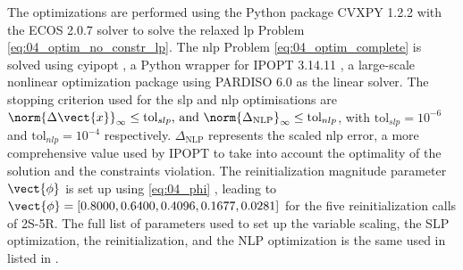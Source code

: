 The optimizations are performed using the Python package CVXPY 1.2.2  with the ECOS 2.0.7  solver to solve the relaxed \gls{lp} Problem \eqref{eq:04_optim_no_constr_lp}. The \gls{nlp} Problem \eqref{eq:04_optim_complete} is solved using cyipopt , a Python wrapper for IPOPT 3.14.11 , a large-scale nonlinear optimization package using PARDISO 6.0  as the linear solver. The stopping criterion used for the \gls{slp} and \gls{nlp} optimisations are $\norm{\Delta \vect{x}}_\infty \leq \text{tol}_{slp}  \text{, and } \norm{\Delta_{\text{NLP}}}_\infty \leq \text{tol}_{nlp}$, with $\text{tol}_{slp}=10^{-6}$ and $\text{tol}_{nlp}=10^{-4}$ respectively. $\Delta_{\text{NLP}}$ represents the scaled \gls{nlp} error, a more comprehensive value used by IPOPT to take into account the optimality of the solution and the constraints violation. The reinitialization magnitude parameter $\vect{\phi}$ is set up using \eqref{eq:04_phi} , leading to $\vect{\phi} = \left[ 0.8000, 0.6400, 0.4096, 0.1677, 0.0281 \right]$ for the five reinitialization calls of 2S-5R. The full list of parameters used to set up the variable scaling, the SLP optimization, the reinitialization, and the NLP optimization is the same used in  listed in .

